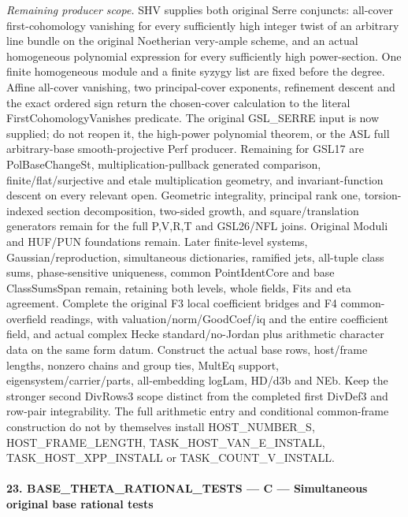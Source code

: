 \documentclass[11pt,a4paper]{article}
\numberwithin{equation}{section}
\theoremstyle{remark}\newtheorem{remark}[theorem]{Remark}
\begin{document}
\emph{Remaining producer scope.} SHV supplies both original Serre conjuncts: all-cover first-cohomology vanishing for every sufficiently high integer twist of an arbitrary line bundle on the original Noetherian very-ample scheme, and an actual homogeneous polynomial expression for every sufficiently high power-section. One finite homogeneous module and a finite syzygy list are fixed before the degree. Affine all-cover vanishing, two principal-cover exponents, refinement descent and the exact ordered sign return the chosen-cover calculation to the literal FirstCohomologyVanishes predicate. The original GSL\_\allowbreak SERRE input is now supplied; do not reopen it, the high-power polynomial theorem, or the ASL full arbitrary-base smooth-projective Perf producer. Remaining for GSL17 are PolBaseChangeSt, multiplication-pullback generated comparison, finite/flat/surjective and etale multiplication geometry, and invariant-function descent on every relevant open. Geometric integrality, principal rank one, torsion-indexed section decomposition, two-sided growth, and square/translation generators remain for the full P,V,R,T and GSL26/NFL joins. Original Moduli and HUF/PUN foundations remain. Later finite-level systems, Gaussian/reproduction, simultaneous dictionaries, ramified jets, all-tuple class sums, phase-sensitive uniqueness, common PointIdentCore and base ClassSumsSpan remain, retaining both levels, whole fields, Fits and eta agreement. Complete the original F3 local coefficient bridges and F4 common-overfield readings, with valuation/norm/GoodCoef/iq and the entire coefficient field, and actual complex Hecke standard/no-Jordan plus arithmetic character data on the same form datum. Construct the actual base rows, host/frame lengths, nonzero chains and group ties, MultEq support, eigensystem/carrier/parts, all-embedding logLam, HD/d3b and NEb. Keep the stronger second DivRows3 scope distinct from the completed first DivDef3 and row-pair integrability. The full arithmetic entry and conditional common-frame construction do not by themselves install HOST\_\allowbreak NUMBER\_\allowbreak S, HOST\_\allowbreak FRAME\_\allowbreak LENGTH, TASK\_\allowbreak HOST\_\allowbreak VAN\_\allowbreak E\_\allowbreak INSTALL, TASK\_\allowbreak HOST\_\allowbreak XPP\_\allowbreak INSTALL or TASK\_\allowbreak COUNT\_\allowbreak V\_\allowbreak INSTALL.



\paragraph{23. BASE\_\allowbreak THETA\_\allowbreak RATIONAL\_\allowbreak TESTS — C — Simultaneous original base rational tests}
\end{document}
